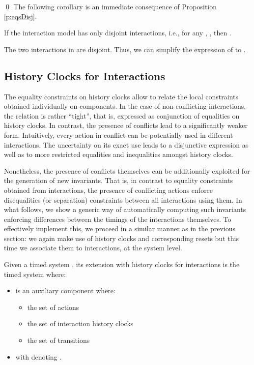 \documentclass{LMCS}
\theoremstyle{plain}\newtheorem{remark}[thm]{Remark}
\theoremstyle{plain}\newtheorem{example}[thm]{Example}
\begin{document}
\vspace*{-.7cm}
\qed
The following corollary is an immediate consequence of Proposition \ref{p:eqsDisj}.
\begin{cor}
 \label{cor:eqsDisj}
If the interaction model  has only
  disjoint interactions, i.e., for any , , then
  .
\end{cor}
The two interactions in  are
disjoint. Thus, we can simplify the expression of  to .




\subsection{History Clocks for Interactions}
\label{sec:methodEx}

The equality constraints on history clocks allow to relate the local
constraints obtained individually on components.  In the case of
non-conflicting interactions, the relation is rather ``tight'', that is,
expressed as conjunction of equalities on history clocks.  In
contrast, the presence of conflicts lead to a significantly weaker
form.  Intuitively, every action in conflict can be potentially used
in different interactions.  The uncertainty on its exact use leads to
a disjunctive expression as well as to more restricted equalities and
inequalities amongst history clocks.

Nonetheless, the presence of conflicts themselves can be additionally
exploited for the generation of new invariants.  That is, in contrast
to equality constraints obtained from interactions, the presence of
conflicting actions enforce disequalities (or separation) constraints
between all interactions using them. In what follows, we show a
generic way of automatically computing such invariants enforcing
differences between the timings of the interactions themselves. To
effectively implement this, we proceed in a similar manner as in the
previous section: we again make use of history clocks and
corresponding resets but this time we associate them to interactions,
at the system level. 
\begin{defi}
\label{def:sc}
Given a timed system , its extension with
history clocks for interactions is the timed system  where:
\begin{itemize}
\item  is an auxiliary component  where:
\begin{itemize}
\item the set of actions 
\item the set of interaction history clocks 
\item the set of transitions 
\end{itemize}
\item  with  denoting .
\end{itemize}
\end{defi}
\end{document}

